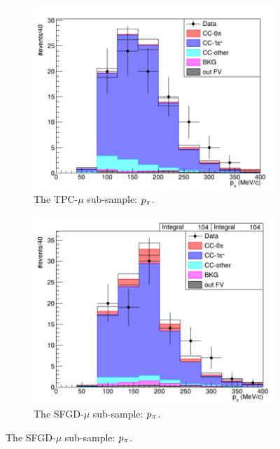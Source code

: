           \begin{figure}[h]
               \centering
               \begin{subfigure}{\dbfigwid\textwidth}
                    \includegraphics[width=\textwidth]{figures/sel/datamc-comp-ppi-tpcmu.png}
                    \caption{The TPC-$\mu$ sub-sample: $p_{\pi}$.}
                    \label{subfig:datamc-tpcmu}
               \end{subfigure}
               \begin{subfigure}{\dbfigwid\textwidth}
                    \includegraphics[width=\textwidth]{figures/sel/datamc-comp-ppi-sfgmu.png}
                    \caption{The SFGD-$\mu$ sub-sample: $p_{\pi}$.}

\end{subfigure}
\end{figure}
